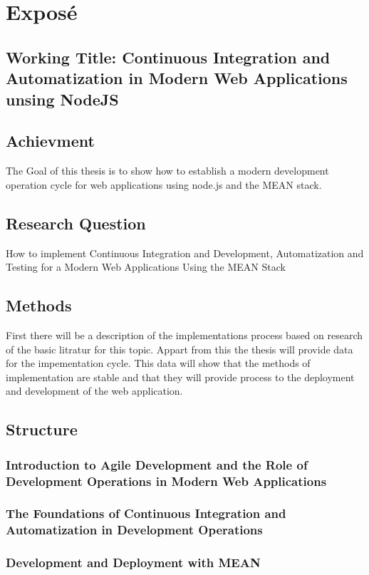 \section{Exposé}

\subsection{Working Title: Continuous Integration and Automatization in Modern Web Applications unsing NodeJS}

\subsection{Achievment}
The Goal of this thesis is to show how to establish a modern development operation cycle for
web applications using node.js and the MEAN stack.

\subsection{Research Question}
How to implement Continuous Integration and Development, Automatization and Testing for a Modern Web Applications
Using the MEAN Stack

\subsection{Methods}
First there will be a description of the implementations process based on research of the basic litratur for this
topic. Appart from this the thesis will provide data for the impementation cycle. This data will show that the methods
of implementation are stable and that they will provide process to the deployment and development of the web application.

\subsection{Structure}
\subsubsection{Introduction to Agile Development and the Role of Development Operations in Modern Web Applications}
\subsubsection{The Foundations of Continuous Integration and Automatization in Development Operations}
\subsubsection{Development and Deployment with MEAN}
